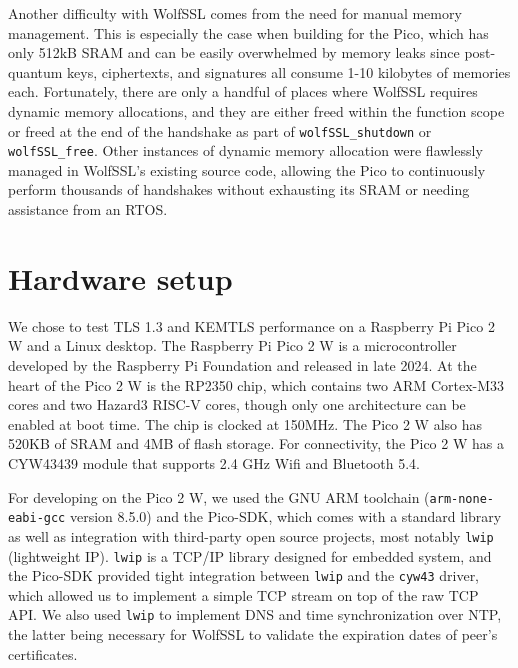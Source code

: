 \documentclass[letterpaper,12pt,titlepage,oneside,final]{book}
\begin{document}
Another difficulty with WolfSSL comes from the need for manual memory management. This is especially the case when building for the Pico, which has only 512kB SRAM and can be easily overwhelmed by memory leaks since post-quantum keys, ciphertexts, and signatures all consume 1-10 kilobytes of memories each. Fortunately, there are only a handful of places where WolfSSL requires dynamic memory allocations, and they are either freed within the function scope or freed at the end of the handshake as part of \texttt{wolfSSL\_shutdown} or \texttt{wolfSSL\_free}. Other instances of dynamic memory allocation were flawlessly managed in WolfSSL's existing source code, allowing the Pico to continuously perform thousands of handshakes without exhausting its SRAM or needing assistance from an RTOS.

\section{Hardware setup}
We chose to test TLS 1.3 and KEMTLS performance on a Raspberry Pi Pico 2 W and a Linux desktop. 
The Raspberry Pi Pico 2 W is a microcontroller developed by the Raspberry Pi Foundation and released in late 2024. 
At the heart of the Pico 2 W is the RP2350 chip, which contains two ARM Cortex-M33 cores and two Hazard3 RISC-V cores, though only one architecture can be enabled at boot time.
The chip is clocked at 150MHz.
The Pico 2 W also has 520KB of SRAM and 4MB of flash storage.
For connectivity, the Pico 2 W has a CYW43439 module that supports 2.4 GHz Wifi and Bluetooth 5.4.

For developing on the Pico 2 W, we used the GNU ARM toolchain (\texttt{arm-none-eabi-gcc} version 8.5.0) and the Pico-SDK, which comes with a standard library as well as integration with third-party open source projects, most notably \texttt{lwip} (lightweight IP).
\texttt{lwip} is a TCP/IP library designed for embedded system, and the Pico-SDK provided tight integration between \texttt{lwip} and the \texttt{cyw43} driver, which allowed us to implement a simple TCP stream on top of the raw TCP API.
We also used \texttt{lwip} to implement DNS and time synchronization over NTP, the latter being necessary for WolfSSL to validate the expiration dates of peer's certificates.
\end{document}
